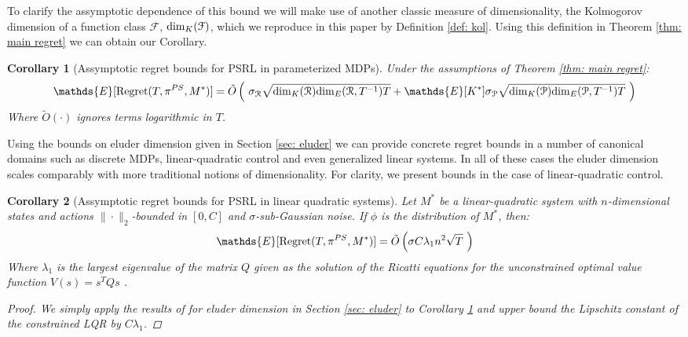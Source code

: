 \documentclass{article}
\newtheorem{corollary}{Corollary}
\newcommand{\Exp}{\mathds{E}}
\newcommand{\Pc}{\mathcal{P}}
\newcommand{\Fc}{\mathcal{F}}
\newcommand{\Rc}{\mathcal{R}}
\begin{document}
To clarify the assymptotic dependence of this bound we will make use of another classic measure of dimensionality, the Kolmogorov dimension of a function class $\Fc$, ${\rm dim}_K(\Fc)$, which we reproduce in this paper by Definition \ref{def: kol}.
Using this definition in Theorem \ref{thm: main regret} we can obtain our Corollary.

\begin{corollary}[Assymptotic regret bounds for PSRL in parameterized MDPs]
\label{cor: ass regret} \hspace{0.00000000000001mm} \newline
Under the assumptions of Theorem \ref{thm: main regret}:
\begin{equation}
	\Exp[{\rm Regret}(T,\pi^{PS},M^*)] = \tilde{O} \left( \ \sigma_\Rc \sqrt{{\rm dim}_K(\Rc) {\rm dim}_E(\Rc,T^{-1}) T}
		+ \Exp[K^*] \sigma_\Pc \sqrt{{\rm dim}_K(\Pc) {\rm dim}_E(\Pc,T^{-1}) T} \ \right)
\end{equation}
Where $\tilde{O}(\cdot)$ ignores terms logarithmic in $T$.
\end{corollary}

Using the bounds on eluder dimension given in Section \ref{sec: eluder} we can provide concrete regret bounds in a number of canonical domains such as discrete MDPs, linear-quadratic control and even generalized linear systems.
In all of these cases the eluder dimension scales comparably with more traditional notions of dimensionality.
For clarity, we present bounds in the case of linear-quadratic control.

\begin{corollary}[Assymptotic regret bounds for PSRL in linear quadratic systems]
\label{cor: LQR} \hspace{0.00000000000001mm} \newline
Let $M^*$ be a linear-quadratic system with $n$-dimensional states and actions $\|\cdot\|_2$-bounded in $[0,C]$ and $\sigma$-sub-Gaussian noise.
If $\phi$ is the distribution of $M^*$, then:
\begin{equation}
	\Exp[{\rm Regret}(T,\pi^{PS},M^*)] = \tilde{O} \left( \sigma C \lambda_1 n^2 \sqrt{T} \ \right)
\end{equation}
Where $\lambda_1$ is the largest eigenvalue of the matrix $Q$ given as the solution of the Ricatti equations for the unconstrained optimal value function $V(s) = s^T Q s$ \cite{bertsekas1995dynamic}.
\begin{proof}
We simply apply the results of for eluder dimension in Section \ref{sec: eluder} to Corollary \ref{cor: ass regret} and upper bound the Lipschitz constant of the constrained LQR by $C \lambda_1$.
\end{proof}
\end{corollary}
\end{document}
